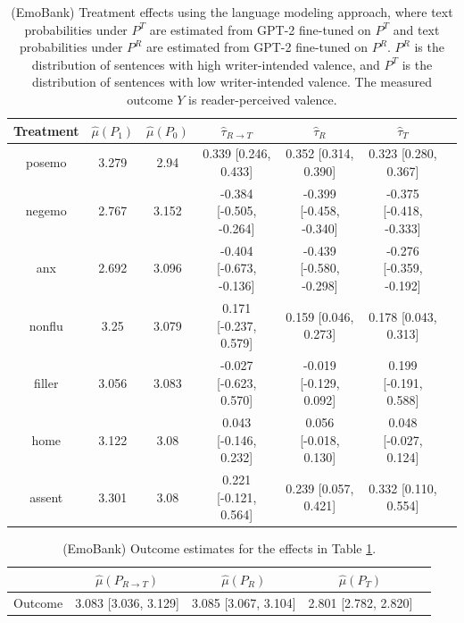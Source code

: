 \documentclass{article}
\begin{document}
\begin{table}[!ht]
\centering
\begin{tabular}{c|cccccc}
\toprule
    Treatment   &   $\hat{\mu}(P_1)$ &   $\hat{\mu}(P_0)$ & $\hat{\tau}_{R \rightarrow T}$   & $\hat{\tau}_R$          & $\hat{\tau}_T$          \\
\midrule
    posemo      &              3.279 &              2.94  & 0.339 [0.246, 0.433]             & 0.352 [0.314, 0.390]    & 0.323 [0.280, 0.367]    \\
    negemo      &              2.767 &              3.152 & -0.384 [-0.505, -0.264]          & -0.399 [-0.458, -0.340] & -0.375 [-0.418, -0.333] \\
    anx         &              2.692 &              3.096 & -0.404 [-0.673, -0.136]          & -0.439 [-0.580, -0.298] & -0.276 [-0.359, -0.192] \\
    nonflu      &              3.25  &              3.079 & 0.171 [-0.237, 0.579]            & 0.159 [0.046, 0.273]    & 0.178 [0.043, 0.313]    \\
    filler      &              3.056 &              3.083 & -0.027 [-0.623, 0.570]           & -0.019 [-0.129, 0.092]  & 0.199 [-0.191, 0.588]   \\
    home        &              3.122 &              3.08  & 0.043 [-0.146, 0.232]            & 0.056 [-0.018, 0.130]   & 0.048 [-0.027, 0.124]   \\
    assent      &              3.301 &              3.08  & 0.221 [-0.121, 0.564]            & 0.239 [0.057, 0.421]    & 0.332 [0.110, 0.554]    \\
\bottomrule
\end{tabular}
\caption{(EmoBank) Treatment effects using the language modeling approach, where text probabilities under $P^T$ are estimated from GPT-2 fine-tuned on $P^T$ and text probabilities under $P^R$ are estimated from GPT-2 fine-tuned on $P^R$. $P^R$ is the distribution of sentences with high writer-intended valence, and $P^T$ is the distribution of sentences with low writer-intended valence. The measured outcome $Y$ is reader-perceived valence.}
\label{tab:results_clm_gpt2_finetuned_emobank_ptpr}
\end{table}

\begin{table}[!ht]
\centering
\begin{tabular}{c|cccc}
\toprule
    & $\hat{\mu}(P_{R \rightarrow T})$   & $\hat{\mu}(P_R)$     & $\hat{\mu}(P_T)$     \\
\midrule
    Outcome & 3.083 [3.036, 3.129]               & 3.085 [3.067, 3.104] & 2.801 [2.782, 2.820] \\
\bottomrule
\end{tabular}
\caption{(EmoBank) Outcome estimates for the effects in Table \ref{tab:results_clm_gpt2_finetuned_emobank_ptpr}.}
\label{tab:results_clm_gpt2_finetuned_emobank_outcome_ptpr}
\end{table}
\end{document}
